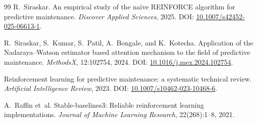 \documentclass[11pt]{article}
\begin{document}
\begin{thebibliography}{99}
R.~Siraskar.
\newblock An empirical study of the na\"{i}ve {REINFORCE} algorithm for predictive maintenance.
\newblock \emph{Discover Applied Sciences}, 2025.
\newblock DOI: \href{https://doi.org/10.1007/s42452-025-06613-1}{10.1007/s42452-025-06613-1}.

R.~Siraskar, S.~Kumar, S.~Patil, A.~Bongale, and K.~Kotecha.
\newblock Application of the {Nadaraya--Watson} estimator based attention mechanism to the field of predictive maintenance.
\newblock \emph{MethodsX}, 12:102754, 2024.
\newblock DOI: \href{https://doi.org/10.1016/j.mex.2024.102754}{10.1016/j.mex.2024.102754}.

Reinforcement learning for predictive maintenance: a systematic technical review.
\newblock \emph{Artificial Intelligence Review}, 2023.
\newblock DOI: \href{https://doi.org/10.1007/s10462-023-10468-6}{10.1007/s10462-023-10468-6}.

A.~Raffin et~al.
\newblock Stable-baselines3: Reliable reinforcement learning implementations.
\newblock \emph{Journal of Machine Learning Research}, 22(268):1--8, 2021.

\end{thebibliography}
\end{document}
